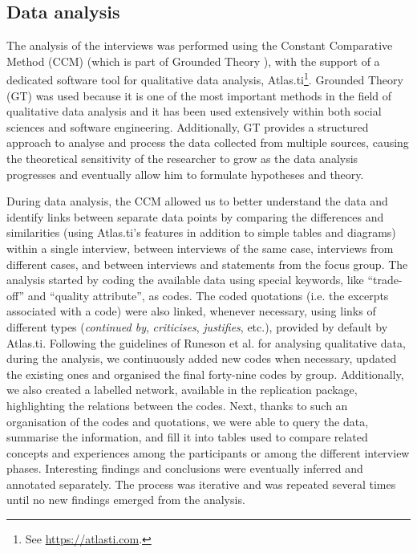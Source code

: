 \subsection{Data analysis}
The analysis of the interviews was performed using the Constant Comparative Method (CCM) \cite{Boeije2002} (which is part of Grounded Theory \cite{Glaser1968}), with the support of a dedicated software tool for qualitative data analysis, Atlas.ti\footnote{See \url{https://atlasti.com}.}.
Grounded Theory (GT) was used because it is one of the most important methods in the field of qualitative data analysis and it has been used extensively within both social sciences and software engineering.
Additionally, GT provides a structured approach to analyse and process the data collected from multiple sources, causing the theoretical sensitivity of the researcher to grow as the data analysis progresses and eventually allow him to formulate hypotheses and theory.

During data analysis, the CCM allowed us to better understand the data and identify links between separate data points by comparing the differences and similarities (using Atlas.ti's features in addition to simple tables and diagrams) within a single interview, between interviews of the same case, interviews from different cases, and between interviews and statements from the focus group.
The analysis started by coding the available data using special keywords, like ``trade-off'' and ``quality attribute'', as codes.
The coded quotations (i.e. the excerpts associated with a code) were also linked, whenever necessary, using links of different types (\textit{continued by}, \textit{criticises}, \textit{justifies}, etc.), provided by default by Atlas.ti.
Following the guidelines of Runeson et al. \cite{Runeson2012} for analysing qualitative data, during the analysis, we continuously added new codes when necessary, updated the existing ones and organised the final forty-nine codes by group.
Additionally, we also created a labelled network, available in the replication package, highlighting the relations between the codes.
Next, thanks to such an organisation of the codes and quotations, we were able to query the data, summarise the information, and fill it into tables used to compare related concepts and experiences among the participants or among the different interview phases. 
Interesting findings and conclusions were eventually inferred and annotated separately.
The process was iterative and was repeated several times until no new findings emerged from the analysis.

